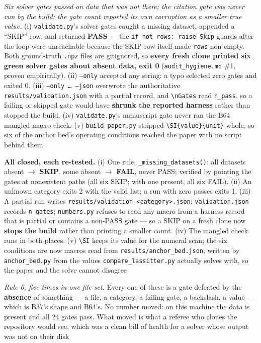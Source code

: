 \documentclass[10pt]{article}
\begin{document}
\begin{description}[leftmargin=0pt,itemsep=1pt]
\item[Defect.] \emph{Six solver gates passed on data that was not there; the citation gate was never run by the build; the gate count reported its own corruption as a smaller true value.} (i) \texttt{validate.py}'s solver gates caught a missing dataset, appended a ``SKIP'' row, and returned \textbf{PASS} --- the \texttt{if not rows: raise Skip} guards after the loop were unreachable because the SKIP row itself made \texttt{rows} non-empty. Both ground-truth \texttt{.npz} files are gitignored, so \textbf{every fresh clone printed six green solver gates about absent data, exit 0} (\texttt{audit\_hygiene.md} \#1, proven empirically). (ii) \texttt{--only} accepted any string: a typo selected zero gates and exited 0. (iii) \texttt{--only \ldots{} --json} overwrote the authoritative \texttt{results/validation.json} with a partial record, and \texttt{\textbackslash{}nGates} read \texttt{n\_pass}, so a failing or skipped gate would have \textbf{shrunk the reported harness} rather than stopped the build. (iv) \texttt{validate.py}'s manuscript gate never ran the B64 mangled-macro check. (v) \texttt{build\_paper.py} stripped \texttt{\textbackslash{}SI\{value\}\{unit\}} whole, so six of the anchor bed's operating conditions reached the paper with no script behind them
\item[Resolution.] \textbf{All closed, each re-tested.} (i) One rule, \texttt{\_missing\_datasets()}: all datasets absent $\rightarrow$ \textbf{SKIP}, some absent $\rightarrow$ \textbf{FAIL}, never PASS; verified by pointing the gates at nonexistent paths (all six SKIP; with one present, all six FAIL). (ii) An unknown category exits 2 with the valid list; a run with zero passes exits 1. (iii) A partial run writes \texttt{results/validation\_<category>.json}; \texttt{validation.json} records \texttt{n\_gates}; \texttt{numbers.py} refuses to read any macro from a harness record that is partial or contains a non-PASS gate --- so a SKIP on a fresh clone now \textbf{stops the build} rather than printing a smaller count. (iv) The mangled check runs in both places. (v) \texttt{\textbackslash{}SI} keeps its value for the numeral scan; the six conditions are now macros read from \texttt{results/anchor\_bed.json}, written by \texttt{anchor\_bed.py} from the values \texttt{compare\_lassitter.py} actually solves with, so the paper and the solve cannot disagree
\item[Note.] \emph{Rule 6, five times in one file set.} Every one of these is a gate defeated by the \textbf{absence} of something --- a file, a category, a failing gate, a backslash, a value --- which is B37's shape and B64's. No number moved: on this machine the data is present and all 24 gates pass. What moved is what a referee who clones the repository would see, which was a clean bill of health for a solver whose output was not on their disk
\end{description}
\end{document}
